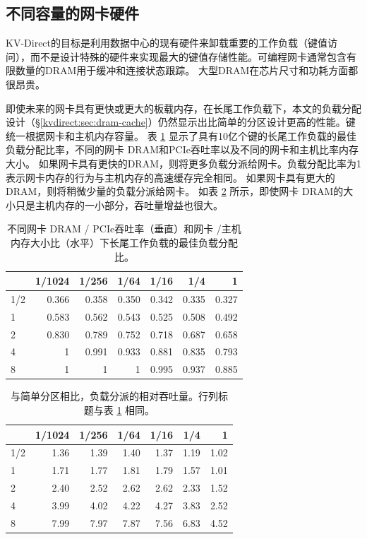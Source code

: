 \subsection{不同容量的网卡硬件}
\label{kvdirect:sec:different-nic}

KV-Direct的目标是利用数据中心的现有硬件来卸载重要的工作负载（键值访问），而不是设计特殊的硬件来实现最大的键值存储性能。可编程网卡通常包含有限数量的DRAM用于缓冲和连接状态跟踪。 大型DRAM在芯片尺寸和功耗方面都很昂贵。

即使未来的网卡具有更快或更大的板载内存，在长尾工作负载下，本文的负载分配设计（\S \ref {kvdirect:sec:dram-cache}）仍然显示出比简单的分区设计更高的性能。键统一根据网卡和主机内存容量。
表 \ref {kvdirect:tab:optimal-load-dispatch} 显示了具有10亿个键的长尾工作负载的最佳负载分配比率，不同的网卡 DRAM和PCIe吞吐率以及不同的网卡和主机比率内存大小。
如果网卡具有更快的DRAM，则将更多负载分派给网卡。负载分配比率为1表示网卡内存的行为与主机内存的高速缓存完全相同。
如果网卡具有更大的DRAM，则将稍微少量的负载分派给网卡。
如表 \ref {kvdirect:tab:optimal-load-dispatch-throughput} 所示，即使网卡 DRAM的大小只是主机内存的一小部分，吞吐量增益也很大。


\begin{table}[htbp]
	\centering
	\caption{不同网卡 DRAM / PCIe吞吐率（垂直）和网卡 /主机内存大小比（水平）下长尾工作负载的最佳负载分配比。}
	\label{kvdirect:tab:optimal-load-dispatch}
	\small
	\begin{tabular}{|l|r|r|r|r|r|r|}
		\hline
		& 1/1024 & 1/256 & 1/64 & 1/16 & 1/4 & 1 \\
		\hline
		1/2  & 0.366 & 0.358 & 0.350 & 0.342 & 0.335 & 0.327 \\
		\hline
		1    & 0.583 & 0.562 & 0.543 & 0.525 & 0.508 & 0.492 \\
		\hline
		2    & 0.830 & 0.789 & 0.752 & 0.718 & 0.687 & 0.658 \\
		\hline
		4    & 1     & 0.991 & 0.933 & 0.881 & 0.835 & 0.793 \\
		\hline
		8    & 1     & 1     & 1     & 0.995 & 0.937 & 0.885 \\
		\hline
	\end{tabular}
\end{table}


\begin{table}[htbp]
	\centering
	\caption{与简单分区相比，负载分派的相对吞吐量。行列标题与表 \ref{kvdirect:tab:optimal-load-dispatch} 相同。}
	\label{kvdirect:tab:optimal-load-dispatch-throughput}
	\small
	\begin{tabular}{|l|r|r|r|r|r|r|}
		\hline
		& 1/1024 & 1/256 & 1/64 & 1/16 & 1/4 & 1 \\
		\hline
		1/2 & 1.36	& 1.39	& 1.40	& 1.37	& 1.19	& 1.02 \\ 
		\hline
		1	& 1.71	& 1.77	& 1.81	& 1.79	& 1.57	& 1.01 \\
		\hline
		2	& 2.40	& 2.52	& 2.62	& 2.62	& 2.33	& 1.52 \\
		\hline
		4	& 3.99	& 4.02	& 4.22	& 4.27	& 3.83	& 2.52 \\
		\hline
		8	& 7.99	& 7.97	& 7.87	& 7.56	& 6.83	& 4.52 \\
		\hline
	\end{tabular}
\end{table}


